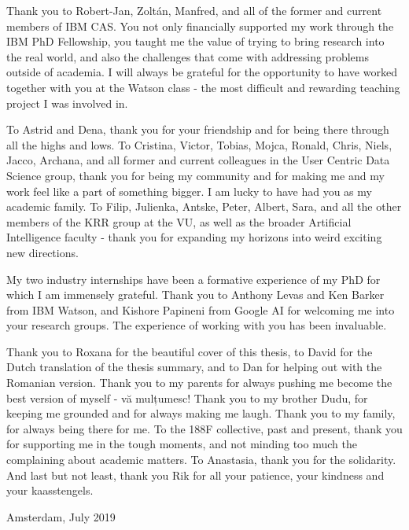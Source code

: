 Thank you to Robert-Jan, Zoltán, Manfred, and all of the former and current members of IBM CAS. You not only financially supported my work through the IBM PhD Fellowship, you taught me the value of trying to bring research into the real world, and also the challenges that come with addressing problems outside of academia. I will always be grateful for the opportunity to have worked together with you at the Watson class - the most difficult and rewarding teaching project I was involved in.

To Astrid and Dena, thank you for your friendship and for being there through all the highs and lows. To Cristina, Victor, Tobias, Mojca, Ronald, Chris, Niels, Jacco, Archana, and all former and current colleagues in the User Centric Data Science group, thank you for being my community and for making me and my work feel like a part of something bigger. I am lucky to have had you as my academic family. To Filip, Julienka, Antske, Peter, Albert, Sara, and all the other members of the KRR group at the VU, as well as the broader Artificial Intelligence faculty - thank you for expanding my horizons into weird exciting new directions.

My two industry internships have been a formative experience of my PhD for which I am immensely grateful. Thank you to Anthony Levas and Ken Barker from IBM Watson, and Kishore Papineni from Google AI for welcoming me into your research groups. The experience of working with you has been invaluable.

Thank you to Roxana for the beautiful cover of this thesis, to David for the Dutch translation of the thesis summary, and to Dan for helping out with the Romanian version. Thank you to my parents for always pushing me become the best version of myself - vă mulțumesc! Thank you to my brother Dudu, for keeping me grounded and for always making me laugh. Thank you to my family, for always being there for me. To the 188F collective, past and present, thank you for supporting me in the tough moments, and not minding too much the complaining about academic matters. To Anastasia, thank you for the solidarity. And last but not least, thank you Rik for all your patience, your kindness and your kaasstengels.

\bigskip

\begin{flushright}
Amsterdam, July 2019
\end{flushright}

\vfill

